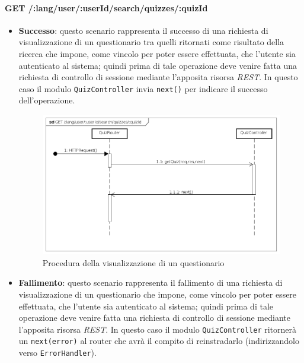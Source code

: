 \paragraph{GET /:lang/user/:userId/search/quizzes/:quizId}
\begin{itemize}
\item \textbf{Successo}: questo scenario rappresenta il successo di una richiesta di visualizzazione di un questionario tra quelli ritornati come risultato della ricerca che impone, come vincolo per poter essere effettuata, che l'utente sia autenticato al sistema; quindi prima di tale operazione deve venire fatta una richiesta di controllo di sessione mediante l'apposita risorsa \textit{REST}. In questo caso il modulo \texttt{QuizController} invia \texttt{next()} per indicare il successo dell'operazione.

\begin{figure}[ht]
	\centering
	\includegraphics[scale=0.45]{UML/DiagrammiDiSequenza/Back-end/GET__lang_user__userId_search_quizzes__quizId_success.png}
	\caption{Procedura della visualizzazione di un questionario}
\end{figure}
\FloatBarrier

\item \textbf{Fallimento}: questo scenario rappresenta il fallimento di una richiesta di visualizzazione di un questionario che impone, come vincolo per poter essere effettuata, che l'utente sia autenticato al sistema; quindi prima di tale operazione deve venire fatta una richiesta di controllo di sessione mediante l'apposita risorsa \textit{REST}. In questo caso il modulo \texttt{QuizController} ritornerà un \texttt{next(error)} al router che avrà il compito di reinstradarlo (indirizzandolo verso \texttt{ErrorHandler}).


\end{itemize}

